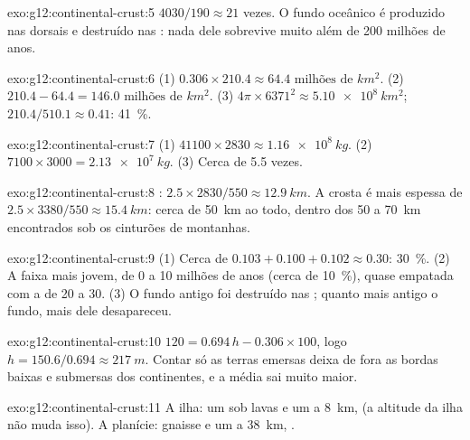 \begin{solution}{exo:g12:continental-crust:5}
$4030/190 \approx 21$ vezes. O fundo oceânico é produzido nas dorsais e
destruído nas : nada dele sobrevive muito além de 200
milhões de anos.
\end{solution}

\begin{solution}{exo:g12:continental-crust:6}
(1) $0.306 \times 210.4 \approx \num{64.4}\text{ milhões de }\unit{km^2}$.
(2) $210.4 - 64.4 = \num{146.0}\text{ milhões de }\unit{km^2}$.
(3) $4\pi \times 6371^2 \approx \qty{5.10e8}{km^2}$; $210.4/510.1 \approx
0.41$: \qty{41}{\percent}.
\end{solution}

\begin{solution}{exo:g12:continental-crust:7}
(1) $41100 \times 2830 \approx \qty{1.16e8}{kg}$. (2) $7100 \times 3000 =
\qty{2.13e7}{kg}$. (3) Cerca de 5.5 vezes.
\end{solution}

\begin{solution}{exo:g12:continental-crust:8}
: $2.5 \times 2830/550 \approx \qty{12.9}{km}$. A crosta é mais espessa
de $2.5 \times 3380/550 \approx \qty{15.4}{km}$: cerca de \qty{50}{km} ao
todo, dentro dos 50 a \qty{70}{km} encontrados sob os cinturões de
montanhas.
\end{solution}

\begin{solution}{exo:g12:continental-crust:9}
(1) Cerca de $0.103 + 0.100 + 0.102 \approx 0.30$: \qty{30}{\percent}.
(2) A faixa mais jovem, de 0 a 10 milhões de anos (cerca de
\qty{10}{\percent}), quase empatada com a de 20 a 30. (3) O fundo antigo foi
destruído nas ; quanto mais antigo o fundo, mais dele
desapareceu.
\end{solution}

\begin{solution}{exo:g12:continental-crust:10}
$120 = 0.694\,h - 0.306 \times 100$, logo $h = 150.6/0.694 \approx
\qty{217}{m}$. Contar só as terras emersas deixa de fora as bordas baixas e
submersas dos continentes, e a média sai muito maior.
\end{solution}

\begin{solution}{exo:g12:continental-crust:11}
A ilha: um  sob lavas e um  a \qty{8}{km},  (a
altitude da ilha não muda isso). A planície: gnaisse e um  a
\qty{38}{km}, .
\end{solution}

